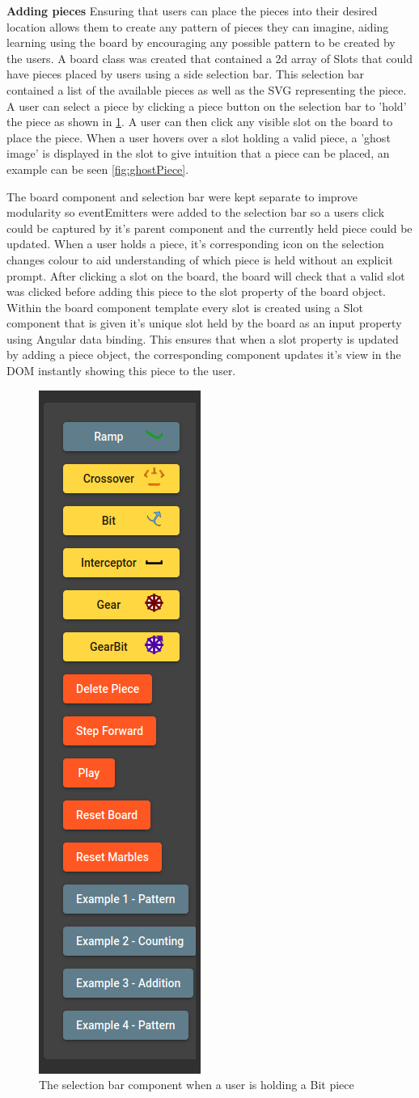 \documentclass{l4proj}
\begin{document}
\textbf{Adding pieces}
Ensuring that users can place the pieces into their desired location allows them to create any pattern of pieces they can imagine, aiding learning using the board by encouraging any possible pattern to be created by the users. A board class was created that contained a 2d array of Slots that could have pieces placed by users using a side selection bar. This selection bar contained a list of the available pieces as well as the SVG representing the piece. A user can select a piece by clicking a piece button on the selection bar to 'hold' the piece as shown in \ref{fig:selectionBar}. A user can then click any visible slot on the board to place the piece. When a user hovers over a slot holding a valid piece, a 'ghost image' is displayed in the slot to give intuition that a piece can be placed, an example can be seen \ref{fig:ghostPiece}. 

The board component and selection bar were kept separate to improve modularity so eventEmitters were added to the selection bar so a users click could be captured by it's parent component and the currently held piece could be updated. When a user holds a piece, it's corresponding icon on the selection changes colour to aid understanding of which piece is held without an explicit prompt. After clicking a slot on the board, the board will check that a valid slot was clicked before adding this piece to the slot property of the board object. Within the board component template every slot is created using a Slot component that is given it's unique slot held by the board as an input property using Angular data binding. This ensures that when a slot property is updated by adding a piece object, the corresponding component updates it's view in the DOM instantly showing this piece to the user.

\begin{figure}
    \centering
    \includegraphics[width=0.2\linewidth]{images/selectionBar.png}
    \caption{The selection bar component when a user is holding a Bit piece}
    \label{fig:selectionBar}
\end{figure}
\end{document}
